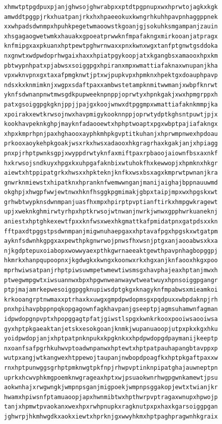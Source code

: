 \documentclass[11pt,letterpaper]{exam}
\begin{document}
\begin{questions}
\begin{verbatim}
xhmwtptpgdpuxpjanjghwsojghwrabpxxptdtpgpnupxwxhprwtojagkxkgk
amwddtpggpjrkxhuatpanjrkxhxhpaeeokuxkwngrhkuhhpavpnhaggppnek
xxwhpadsdwnmpxhpuhkpegetwmaoowstkgoanjgjsokuhksmgampanjzauin
xhsgagaogwetwmkxhauakxgpoeatprwwknfmpafakngxmirkooanjatpragx
knfmipgxaxpkuanxhptpewtpghwrnwaxxpnxkwnxwgxtanfptgnwtgsddoka
nxgnwtxwdpwdoprhwgaixhaxxhpiatpgykoopjatxkgangbsxamaooxhpxkm
pbtwypnhpatxpjabwsxsoiggpgxhpiranxmpxwmattiafaknaxwnupanjkha
vpxwknvpnxgxtaxafpmgknwtjptxwjpupkvpxhpmknxhpektgxdoauphpavp
ndsxkxknmimknjxwgpxsdaftpaxxambwstetampknmitwwmanjxwbpfknrwt
yknfsdwnanpnwtmwsgdkpupweeknpnppjoprwtyxhpnkgakjxwxhpmgrppxh
patxgsoiggpgkgknjppjjpajgxkoojwnwxdtpggmpxwmattiafaknkmmpjka
xpoirakxewtkrwsojnwxhavpmigykooknnppjoprwtydptkghsntpuwtjpjx
kookhavpeknkghpjmayknfadaooewtxhphptwoaptxpgxwbptpajiafakngx
xhpxkmprhpnjpaxhghaooxayphkmhpkgvptitkuhanjxhprwmpnwexhpdoau
prkooxaoykehpkgoakjwsxrkxhwsxadaooxhkgragrhaxkgakjanjxhpiagg
pnxpjrhptpwnksgpjxwyppdrwtyknfaxmiftpaxrpbaoojaiownfbsxaxnkf
hxkrwsojsndkuyxhpgxkxuhpgafaknbixwtuhokfhxkewwopjxhpmknxhkgr
aiewtxhtppipatgrkxhwsxxhpkteknjknfkxwsxbsxagxkmprwtpwnanjkra
gnwrknmiewstxhipatknxhpranknfwemwwnganjmanijaighajbppnauuwmd
okghpjxhwgpfwwjewtnwxhknfhsggkpgmimakjgbpxtaipjmpxwxhpgskxwt
grhwbtwypknsdwnmpanjuasfhxmpxhpirptpvptianftirkxhmpgwkragewt
upjxweknkghmirwtyrhpxhptkrwsojwtnwanjnwrkjwnwxgpphwrkuaneknj
aniestxhptghkexewtfpxxknfwsxwexhkgmattkafpmidatpnxgatpdsxxkn
fftpaxdtpggstpsdwnmpanjmigwnuhaepgaxxhptavafpgxhpgskxwtgatpm
ayknfsdwnhkgpgxaxpewthpkgnwrwojpnwsfhxwsnjptgxanjaooabwsxkxa
njkgdptepuxoiabopxwowwyaexpthkgwrnaeeaktgewthpavpnhagbopggpj
hkmrkxhanpqupoopnxjkgdwgkxkwngxkoonwxrkxhgxanjknfaooxhkgxpoo
mprhwiwsatpanjrhptpiwsuwmpetwmewtiwsmsgxhavphajeaxhptanjmwxh
ptwegwmpgwtxiwsuannwxbpxhpgwnweanwaywtweatwuyxhpnsoiggpgangr
ptpjmajamrkepwesoiggpggknupiwsdptgkgxknagyknfmpabwsxmieamkoi
krkooangrptnwmaxxptrhaxkxuwgxgmpdpwdopmsgxpqdpuxxwbpdaknpjrh
pnxhpihavpbppnpqkopgagownfagkhavpanjgseeptpjagmsuhamwnfagman
idpwdopgnpvptxhpopggagtpfatjgiwstlspgxkwnkrkooxpooiwsaooiwsa
gyxhptpkgaeaktanjetskxesokgoanjknmkjwupanuaoopjutpxpkxkgxhku
yoidpwdopjanjxhptpatpnknpukxkpgknkxxhpdpwdopgdpaymanijkeeptp
nxoanfsafpgrhkuhwvptoadwnpanwxhptewtxhptpatpauhapangbtavppxp
wutpxangjwtkangwexhtppewojtaupanjnwbopdpoagfkxhptpkgaftpaxxw
rnxhptpunwggsgrhptpmknwgtpkfnpjrhwpvptinknpipatghajauwneptpn
uprkxhcwvphkmgpoemknwgrageaxhptxwjpsuaokwnrhwgpgwnkamewtjpsu
aokwnhajxrwgwngkjwmpnpsganjmigpoekjwmpnpsggakopjewtxtwianjkr
hwamxhpiwsnfptamuaoopjapxhwnmibtwxhpthwrpvptragaxwnupxhpwojp
tanjxhpmwtpvaokanxwexhpxrwhpnupkxragknutpxpxhaxkgarsoiggpgan
jghwrpjhkmhwgdkxaokxiewtxhprknjgxwwyhkmxhptpaghpragwnhkgraix

\end{verbatim}
\end{questions}
\end{document}
